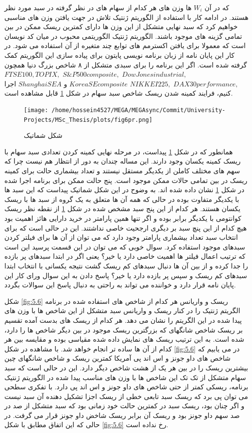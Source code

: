 \documentclass[a4paper,titlepage,12pt,fleqn,oneside]{report}
\begin{document}
 که در آن
$W_i$
ها وزن های هر کدام از سهام های در نظر گرفته در سبد مورد نظر  هستند. در ادامه کار با استفاده از الگوریتم ژنتیک تلاش در جهت یافتن وزن های مناسبی خواهیم کرد که سبد نهایی متشکل از این وزن ها دارای کمترین ریسک ممکن در بین تمامی گزینه های موجود باشند. 
الگوریتم ژنتیک الگوریتمی محبوب در میان کد نویسان است که معمولا برای یافتن اکسترمم های توابع چند متغیره از آن استفاده می شود. در کار این پایان نامه از زبان برنامه نویسی پایتون برای پیاده سازی این الگوریتم کمک گرفته شده است. اگر این برنامه را برای سبدی متشکل از ۸ شاخص بزرگ دنیا همچون 
$Dow Jones industrial, $
$S\&P 500 composite,$
$ FTSE 100, TOPIX ,$
$DAX 30 performance,$
$ NIKKEI 225,$
$ Korea SE composite $
و
 $ Shanghai SE A$
 اجرا کنیم، فرایند کمینه شدن ریسک شاخص سبد سهام در شکل 
 \ref{fig:5.5}
 قابل مشاهده است.
\begin{figure}[ptb]
	\centering
	\texttt{[image: /home/hossein4527/MEGA/MEGAsync/Commit/University-Projects/MSc\_Thesis/plots/fig6pr.png]}
	\caption{شکل شماتیک }
	\label{fig:5.5}
\end{figure}
همانطور که در شکل 
\ref{fig:5.5}
پیداست، در مرحله نهایی کمینه کردن تعدادی سبد سهام با ریسک کمینه یکسان وجود دارند. این مساله چندان به دور از انتظار هم نیست چرا که سهم های مختلف کاملن از یکدیگر مستقل نیستند و تعداد بیشماری حالت برای کمینه ریسک در بین تمامی حالات ممکن موجود است. پنج حالت ممکن برای برنامه اجرا شده در شکل 
\ref{fig:5.5}
نشان داده شده اند. به وضوح در این شکل شماتیک پیداست که این سبد ها با یکدیگر متفاوت بوده در حالی که همه آن ها متعلق به یک گروه از سبد ها با ریسک یکسان هستند.  هر کدام از این پنج سبد مشخص شده در شکل
\ref{fig:5.5}
از نقطه نظر ریسک کوانتومی با یکدیگر برابر بوده و اگر تنها همین پارامتر در خرید دارایی هائز اهمیت بود هیچ کدام از این پنچ سبد بر دیگری ارجحیت خاصی نداشتند. این در حالی است که برای انتخاب سبد تعداد بیشماری پارامتر وجود دارد که می توان از آن ها برای فیلتر کردن سبدهای موجود استفاده کرد. سوال خوبی که می توان در این قسمت پرسید این است که ترتیب اعمال فیلتر ها اهمیت خاصی دارد یا خیر؟ یعنی اگر در ابتدا سبدهای پر بازده را جدا کرده و از بین آن ها دنبال سبدهای کم ریسک گشت نتیجه یکسانی با انتخاب ابتدا سبدهای کم ریسک و سپس پر بازده دارد یا خیر؟ پاسخ دادن به این سوال ورای کار این پایان نامه قرار دارد و خواننده می تواند به راحتی به دنبال پاسخ این سوالات بگردد.

شکل 
\ref{fig:5.6}
ریسک و واریانس هر کدام از شاخص های استفاده شده در برنامه الگریتم ژنتیک را در کنار ریسک و واریانس سبد متشکل از این شاخص ها با وزن های پیدا شده در این الگریتم را نشان می دهد. 
هر کدام از ریسک های بدست آمده تقسیم بر ریسک شاخص شانگهای که بزرگترین ریسک  موجود در بین دیگر شاخص ها را دارد، شده است. به این ترتیب ریسک های نمایش داده شده مقیاسی بوده و مقایسه بین هر کدام از آن ها ساده تر انجام خواهد شد. با مشاهده در شکل 
\ref{fig:5.6}
در می یابیم که شاخص های داو جونز و اس اند پی آمریکا کمترین ریسک و شاخص شانگهای چین بیشترین ریسک را در بین هر یک از هشت شاخص دیگر دارد. این در حالی است که سبد سهام متشکل از تک تک این شاخص ها با وزن های مناسب پیدا شده در الگوریتم ژنتیک برنامه، ریسکی کمتر از حتی شاخص های داو جونز و اس اند پی دارد. با تفکری سطحی می توان پی برد که ریسک سبد تابعی خطی از ریسک اجزا تشکیل دهنده آن سبد نیست و اگر چنان بود، ریسک سبد در کمترین حالت خود زمانی بود که سبد متشکل از صد در صد سهم داو جونز بود و ریسک آن برابر ریسک شاخض داو جونز قرار می گرفت. در حالی که این اتفاق مطابق با شکل
\ref{fig:5.6}
رخ نداده است.
\end{document}
